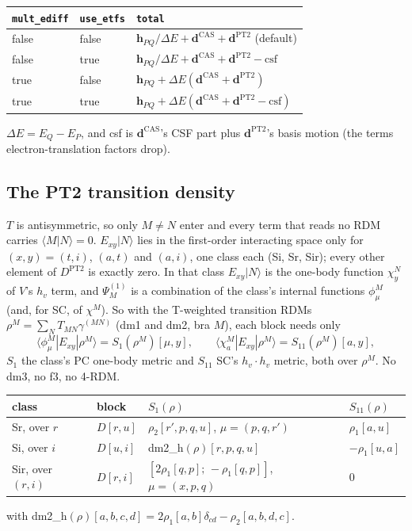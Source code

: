 \documentclass[11pt]{article}
\newcommand{\code}[1]{\texttt{#1}}
\begin{document}
\begin{center}
\small
\begin{tabular}{@{}lll@{}}
\toprule
\code{mult\_ediff} & \code{use\_etfs} & \code{total} \\
\midrule
false & false & $\mathbf h_{PQ}/\Delta E + \mathbf d^{\mathrm{CAS}} + \mathbf d^{\mathrm{PT2}}$ (default) \\
false & true  & $\mathbf h_{PQ}/\Delta E + \mathbf d^{\mathrm{CAS}} + \mathbf d^{\mathrm{PT2}} - \mathrm{csf}$ \\
true  & false & $\mathbf h_{PQ} + \Delta E(\mathbf d^{\mathrm{CAS}} + \mathbf d^{\mathrm{PT2}})$ \\
true  & true  & $\mathbf h_{PQ} + \Delta E(\mathbf d^{\mathrm{CAS}} + \mathbf d^{\mathrm{PT2}} - \mathrm{csf})$ \\
\bottomrule
\end{tabular}
\end{center}
$\Delta E = E_Q - E_P$, and csf is $\mathbf d^{\mathrm{CAS}}$'s CSF part plus
$\mathbf d^{\mathrm{PT2}}$'s basis motion (the terms electron-translation
factors drop).

\subsection{The PT2 transition density}
\label{sec:pt2}

$T$ is antisymmetric, so only $M\ne N$ enter and every term that reads no
RDM carries $\langle M|N\rangle = 0$. $E_{xy}|N\rangle$ lies in the first-order
interacting space only for $(x,y) = (t,i)$, $(a,t)$ and $(a,i)$, one class
each (Si, Sr, Sir); every other element of $D^{\mathrm{PT2}}$ is exactly
zero. In that class $E_{xy}|N\rangle$ is the one-body function $\chi^N_y$ of
$V$'s $h_v$ term, and $\Psi^{(1)}_M$ is a combination of the class's internal
functions $\phi^M_\mu$ (and, for SC, of $\chi^M$). So with the T-weighted
transition RDMs $\rho^M = \sum_N T_{MN}\gamma^{(MN)}$ (dm1 and dm2, bra $M$),
each block needs only
\begin{equation}
  \langle\phi^M_\mu|E_{xy}|\rho^M\rangle = S_1(\rho^M)[\mu, y],\qquad
  \langle\chi^M_a|E_{xy}|\rho^M\rangle = S_{11}(\rho^M)[a, y],
\end{equation}
$S_1$ the class's PC one-body metric and $S_{11}$ SC's $h_v\cdot h_v$ metric,
both over $\rho^M$. No dm3, no f3, no 4-RDM.

\begin{center}
\small
\begin{tabular}{@{}llll@{}}
\toprule
class & block & $S_1(\rho)$ & $S_{11}(\rho)$ \\
\midrule
Sr, over $r$ & $D[r,u]$ & $\rho_2[r',p,q,u]$, $\mu = (p,q,r')$ & $\rho_1[a,u]$ \\
Si, over $i$ & $D[u,i]$ & dm2\_h$(\rho)[r,p,q,u]$ & $-\rho_1[u,a]$ \\
Sir, over $(r,i)$ & $D[r,i]$ & $[2\rho_1[q,p];\,-\rho_1[q,p]]$, $\mu = (x,p,q)$ & 0 \\
\bottomrule
\end{tabular}
\end{center}
with dm2\_h$(\rho)[a,b,c,d] = 2\rho_1[a,b]\delta_{cd} - \rho_2[a,b,d,c]$.
\end{document}
